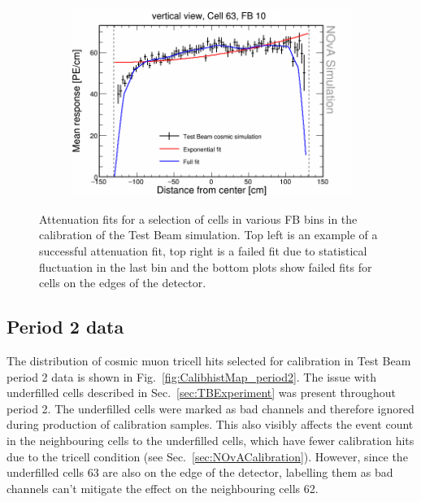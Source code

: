 \begin{figure}[h]
\begin{subfigure}{0.495\textwidth}
  \end{subfigure}
  \begin{subfigure}{0.495\textwidth}
    \includegraphics[width=\linewidth]{Plots/RelativeCalibrationResults/sim_fb10_000_063.png}
  \end{subfigure}
  \caption[Example attenuation fits for simulation]{Attenuation fits for a selection of cells in various \acrshort{FB} bins in the calibration of the Test Beam simulation. Top left is an example of a successful attenuation fit, top right is a failed fit due to statistical fluctuation in the last bin and the bottom plots show failed fits for cells on the edges of the detector.}
  \label{fig:AttenfitResultsSimulation}
\end{figure}

\subsection{Period 2 data}
The distribution of cosmic muon tricell hits selected for calibration in Test Beam period 2 data is shown in Fig.~\ref{fig:CalibhistMap_period2}.
The issue with underfilled cells described in Sec.~\ref{sec:TBExperiment} was present throughout period 2. The underfilled cells were marked as bad channels and therefore ignored during production of calibration samples. This also visibly affects the event count in the neighbouring cells to the underfilled cells, which have fewer calibration hits due to the tricell condition (see Sec.~\ref{sec:NOvACalibration}). However, since the underfilled cells 63 are also on the edge of the detector, labelling them as bad channels can't mitigate the effect on the neighbouring cells 62.


